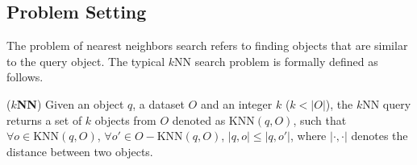 \begin{comment}
To reduce such
\emph{false positives}, a group of $m$ hash functions
$G(\cdot)=\{h_1(\cdot),h_2(\cdot),\ldots,h_m(\cdot)\}$ are employed. Thus, each object $o$ is labeled with a compound hash key
$G(o)=\{h_1(o),h_2(o),\ldots,h_m(o)\}$, which is the bucket key. Then, the probability that two objects collide is reduced as follows.
\begin{equation}\label{eq:prob1}
%
\begin{aligned}
%
  Pr[G(o_1)=G(o_2)]=\prod_{i=1}^m Pr[h_i(o_1)=h_i(o_2)]=p^m
%
\end{aligned}
%
\end{equation}
In order to reduce the loss of false negatives, a set of $l$ hash groups $\{G_1(\cdot),G_2(\cdot),\ldots,G_l(\cdot)\}$ are employed and $l$ hash tables are constructed, hoping that the close points collide at least on one hash table. The final collision probability $P$ is:
\begin{equation}\label{eq:prob2}
%
\begin{aligned}
%
  P=1-\prod_{i=1}^l \Big\{1-Pr[G_i(o_1)=G_i(o_2)]\Big\}=1-[1-p^m]^l
\end{aligned}
%
\end{equation}
Given a query $q$, a candidate set by the union of $l$ buckets that
query $q$ is hashed to is generated. Then, these candidates are ranked according to their distances to $q$, and finally the top $k$ candidates are returned.
\end{comment}

\subsection{Problem Setting}

The problem of nearest neighbors search refers to finding objects that are similar to the query object. The typical $k$NN search problem is formally defined as follows.

\begin{definition}
\label{def:knn}
(\textbf{$k$NN}) Given an object $q$, a dataset $O$ and an integer $k$ ($k<|O|$), the $k$NN query returns a set of $k$ objects from $O$ denoted as $\text{KNN}(q,O)$, such that $\forall o\in \text{KNN}(q,O)$, $\forall o'\in O-\text{KNN}(q,O)$, $|q,o|\leq|q,o'|$, where $|\cdot,\cdot|$ denotes the distance between two objects.
\end{definition}

